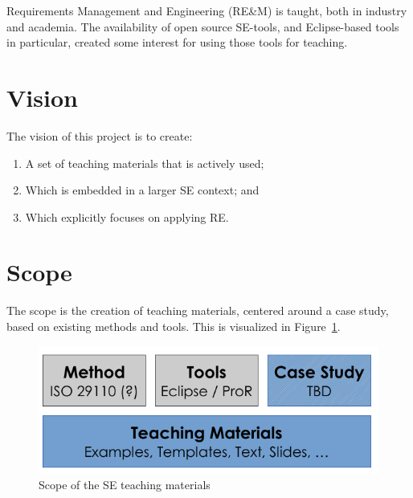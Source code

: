Requirements Management and Engineering (RE\&M) is taught, both in industry and academia. The availability of open source SE-tools, and Eclipse-based tools in particular, created some interest for using those tools for teaching. 

\section{Vision}

The vision of this project is to create:

\begin{enumerate}
\item A set of teaching materials that is actively used; 
\item Which is embedded in a larger SE context; and
\item Which explicitly focuses on applying RE. 
\end{enumerate}

\section{Scope}

The scope is the creation of teaching materials, centered around a case study, based on existing methods and tools. This is visualized in Figure~\ref{fig:scope}.

\begin{figure}[h!]
  \centering
  \includegraphics[width=\textwidth]{../se-images/teaching-overview.pdf}
  \caption{Scope of the SE teaching materials}
  \label{fig:scope}
\end{figure}

